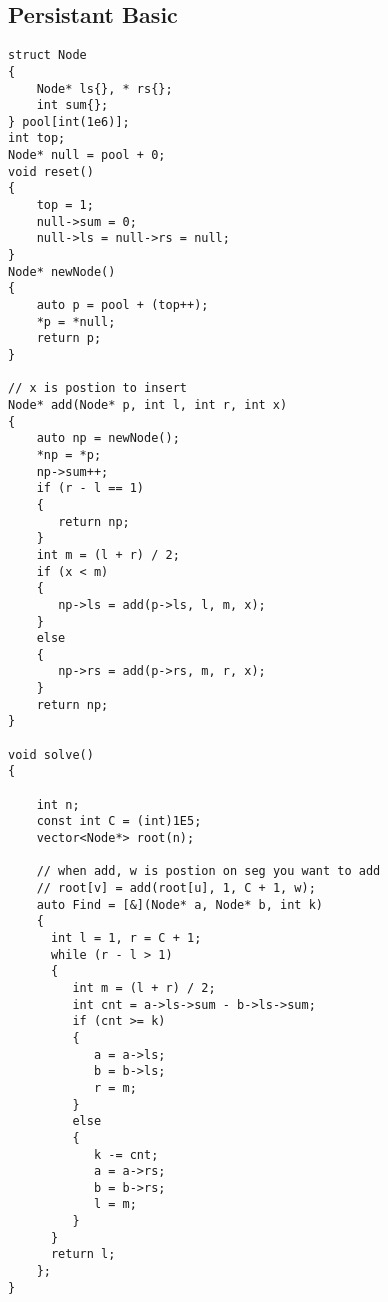 \documentclass{article}
\begin{document}
\subsection{Persistant Basic}
\begin{verbatim}
struct Node  
{  
    Node* ls{}, * rs{};  
    int sum{};  
} pool[int(1e6)];  
int top;  
Node* null = pool + 0;  
void reset()  
{  
    top = 1;  
    null->sum = 0;  
    null->ls = null->rs = null;  
}  
Node* newNode()  
{  
    auto p = pool + (top++);  
    *p = *null;  
    return p;  
}  
  
// x is postion to insert  
Node* add(Node* p, int l, int r, int x)  
{  
    auto np = newNode();  
    *np = *p;  
    np->sum++;  
    if (r - l == 1)  
    {  
       return np;  
    }  
    int m = (l + r) / 2;  
    if (x < m)  
    {  
       np->ls = add(p->ls, l, m, x);  
    }  
    else  
    {  
       np->rs = add(p->rs, m, r, x);  
    }  
    return np;  
}  
  
void solve()  
{  
  
    int n;  
    const int C = (int)1E5;  
    vector<Node*> root(n);  
  
    // when add, w is postion on seg you want to add  
    // root[v] = add(root[u], 1, C + 1, w);    
    auto Find = [&](Node* a, Node* b, int k)  
    {  
      int l = 1, r = C + 1;  
      while (r - l > 1)  
      {  
         int m = (l + r) / 2;  
         int cnt = a->ls->sum - b->ls->sum;  
         if (cnt >= k)  
         {  
            a = a->ls;  
            b = b->ls;  
            r = m;  
         }  
         else  
         {  
            k -= cnt;  
            a = a->rs;  
            b = b->rs;  
            l = m;  
         }  
      }  
      return l;  
    };  
}  
\end{verbatim}
\end{document}
